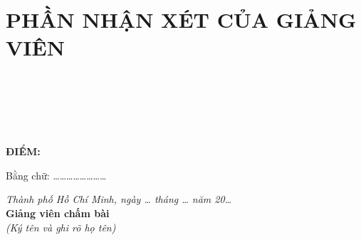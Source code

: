 
\chapter*{PHẦN NHẬN XÉT CỦA GIẢNG VIÊN}

\newcommand{\dongnhanxet}{\noindent\hspace*{1.27cm}\hrulefill\\[0.65cm]}
\vspace{0.3cm}
\dongnhanxet
\dongnhanxet
\dongnhanxet
\dongnhanxet
\dongnhanxet

\vspace{0.5cm}
\noindent\hspace{1.27cm}\textbf{ĐIỂM:}\hspace{1cm}

\vspace{0.3cm}
\noindent\hspace{2.54cm}Bằng chữ: \ldots\ldots\ldots\ldots\ldots\ldots\ldots\ldots

\vspace{1.2cm}
\begin{flushright}
\begin{minipage}{10.5cm}
\centering
\textit{Thành phố Hồ Chí Minh, ngày \ldots{} tháng \ldots{} năm 20\ldots}\\[0.5cm]
\textbf{Giảng viên chấm bài}\\[0.2cm]
\textit{(Ký tên và ghi rõ họ tên)}
\end{minipage}
\end{flushright}

\vspace{3cm}
\clearpage
